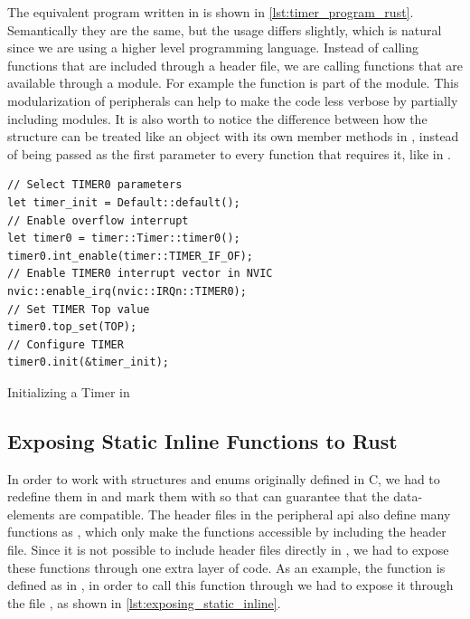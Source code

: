 The equivalent program written in {\rust} is shown in \autoref{lst:timer_program_rust}.
Semantically they are the same, but the usage differs slightly, which is natural since we are using a higher level programming language.
Instead of calling functions that are included through a {\C} header file, we are calling functions that are available through a {\rust} module.
For example the  function is part of the  module.
This modularization of peripherals can help to make the code less verbose by partially including modules.
It is also worth to notice the difference between how the  structure can be treated like an object with its own member methods in {\rust}, instead of being passed as the first parameter to every function that requires it, like in {\C}.

\begin{listing}[h]
\begin{verbatim}
// Select TIMER0 parameters
let timer_init = Default::default();
// Enable overflow interrupt
let timer0 = timer::Timer::timer0();
timer0.int_enable(timer::TIMER_IF_OF);
// Enable TIMER0 interrupt vector in NVIC
nvic::enable_irq(nvic::IRQn::TIMER0);
// Set TIMER Top value
timer0.top_set(TOP);
// Configure TIMER
timer0.init(&timer_init);
\end{verbatim}
\caption{Initializing a Timer in {\rust}}
\label{lst:timer_program_rust}
\end{listing}

\subsection{Exposing Static Inline Functions to Rust}
\label{ssec:exposing_static_inline_functions_to_rust}

In order to work with structures and enums originally defined in C, we had to redefine them in {\rust} and mark them with \attrib{\#[repr(C)]} so that {\rust} can guarantee that the data-elements are {\C} compatible.
The header files in the peripheral \gls{api} also define many functions as , which only make the functions accessible by including the header file.
Since it is not possible to include {\C} header files directly in {\rust}, we had to expose these functions through one extra layer of {\C} code.
As an example, the  function is defined as  in , in order to call this function through {\rust} we had to expose it through the file , as shown in \autoref{lst:exposing_static_inline}.

